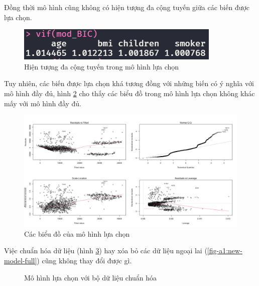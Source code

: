 Đồng thời mô hình cũng không có hiện tượng đa cộng tuyến giữa các biến được lựa chọn.
\begin{figure}[H]
	\centering
	\includegraphics[width=0.35\linewidth]{images/A1/model-bic-vif}
	\caption{Hiện tượng đa cộng tuyến trong mô hình lựa chọn}
	\label{fig-a1:model-bic-vif}
\end{figure}

Tuy nhiên, các biến được lựa chọn khá tương đồng với những biến có ý nghĩa với mô hình đầy đủ, hình \ref{fig-a1:model-bic-plot} cho thấy các biểu đồ trong mô hình lựa chọn không khác mấy với mô hình đầy đủ. 
\begin{figure}[H]
	\centering
	\includegraphics[width=0.7\linewidth]{images/A1/model-bic-plot}
	\caption{Các biểu đồ của mô hình lựa chọn}
	\label{fig-a1:model-bic-plot}
\end{figure}

Việc chuẩn hóa dữ liệu (hình \ref{fig-a1:scaled-model-full}) hay xóa bỏ các dữ liệu ngoại lai (\ref{fig-a1:new-model-full}) cũng không thay đổi được gì.
\begin{figure}[H]
	\centering
	\hfill
	\caption{Mô hình lựa chọn với bộ dữ liệu chuẩn hóa}
	\label{fig-a1:scaled-model-full}
\end{figure}

